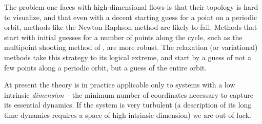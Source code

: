 The problem one faces with high-dimensional flows is 
that their topology is hard to
visualize, and that even with a decent starting guess for a point on
a periodic orbit, methods like the Newton-Raphson method are likely to fail.
Methods that start with initial guesses for a number of points along the
cycle, such as the multipoint shooting method of ,
are more robust.
The relaxation  (or variational) methods take this strategy to its
logical extreme,
and start by a guess of not a few points along a periodic orbit,
but a guess of the entire orbit.

At present the theory is in practice applicable only to systems
with a low intrinsic {\em dimension}
-- the minimum number of coordinates necessary to
capture its essential dynamics.
If the system is very turbulent
(a description of its long time dynamics requires a space of high
intrinsic dimension) we are out of luck. 

% 


